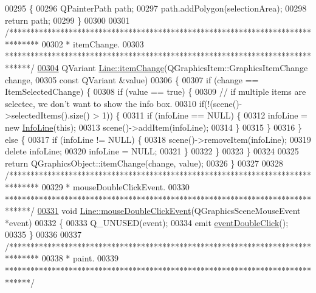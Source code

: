 \begin{DoxyCode}
00295 \textcolor{keyword}{}\{
00296   QPainterPath path;
00297   path.addPolygon(selectionArea);
00298   \textcolor{keywordflow}{return} path;
00299 \}
00300 
00301 \textcolor{comment}{/*******************************************************************************}
00302 \textcolor{comment}{ * itemChange.}
00303 \textcolor{comment}{ ******************************************************************************/}
\hypertarget{line_8cpp_source_l00304}{}\hyperlink{group___models_ga5fcee3f23eb50e34f730d602a3802b93}{00304} QVariant \hyperlink{group___models_ga5fcee3f23eb50e34f730d602a3802b93}{Line::itemChange}(QGraphicsItem::GraphicsItemChange change,
00305                           \textcolor{keyword}{const} QVariant &value)
00306 \{
00307   \textcolor{keywordflow}{if} (change == ItemSelectedChange) \{
00308     \textcolor{keywordflow}{if} (value == \textcolor{keyword}{true}) \{
00309       \textcolor{comment}{// if multiple items are selectec, we don't want to show the info box.}
00310       \textcolor{keywordflow}{if}(!(scene()->selectedItems().size() > 1)) \{
00311         \textcolor{keywordflow}{if} (infoLine == NULL) \{
00312           infoLine = \textcolor{keyword}{new} \hyperlink{class_info_line}{InfoLine}(\textcolor{keyword}{this});
00313           scene()->addItem(infoLine);
00314         \}
00315       \}
00316     \} \textcolor{keywordflow}{else} \{
00317       \textcolor{keywordflow}{if} (infoLine != NULL) \{
00318         scene()->removeItem(infoLine);
00319         \textcolor{keyword}{delete} infoLine;
00320         infoLine = NULL;
00321       \}
00322     \}
00323   \}
00324 
00325   \textcolor{keywordflow}{return} QGraphicsObject::itemChange(change, value);
00326 \}
00327 
00328 \textcolor{comment}{/*******************************************************************************}
00329 \textcolor{comment}{ * mouseDoubleClickEvent.}
00330 \textcolor{comment}{ ******************************************************************************/}
\hypertarget{line_8cpp_source_l00331}{}\hyperlink{group___models_ga9a1fee5b1606ab0deedd04bdab99be70}{00331} \textcolor{keywordtype}{void} \hyperlink{group___models_ga9a1fee5b1606ab0deedd04bdab99be70}{Line::mouseDoubleClickEvent}(QGraphicsSceneMouseEvent *event)
00332 \{
00333   Q\_UNUSED(event);
00334   emit \hyperlink{class_line_a2444b577ea2254994599c6f829c629a5}{eventDoubleClick}();
00335 \}
00336 
00337 \textcolor{comment}{/*******************************************************************************}
00338 \textcolor{comment}{ * paint.}
00339 \textcolor{comment}{ ******************************************************************************/}

\end{DoxyCode}
